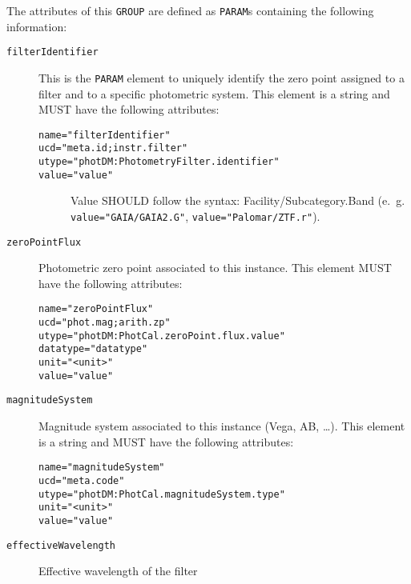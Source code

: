 \documentclass[11pt,a4paper]{ivoa} 
\let\fg=\color
\def\elem#1{{\tt{\fg{DarkRed}#1}}}
\def\attrval#1#2{{\tt{\fg{DarkRed}#1}="{\fg{DarkPurple}#2}"}}
\begin{document}
The attributes of this \elem{GROUP} are defined as \elem{PARAM}s
containing the following information:
\begin{description}
\item[\elem{filterIdentifier}] This is the \elem{PARAM} element to
  uniquely identify the zero point assigned to a filter and to a
  specific photometric system. This element is a string and MUST
  have the following attributes:
\begin{description}
    \item[\attrval{name}{filterIdentifier}]
    \item[\attrval{ucd}{meta.id;instr.filter}]
    \item[\attrval{utype}{photDM:PhotometryFilter.identifier}]
    \item[\attrval{value}{value}] Value SHOULD follow the syntax:
      Facility/Subcategory.Band (e.~g. \attrval{value}{GAIA/GAIA2.G},
      \attrval{value}{Palomar/ZTF.r}).
\end{description}
\item[\elem{zeroPointFlux}] Photometric zero point associated to this
  instance. This element MUST have the following attributes:
\begin{description}
    \item[\attrval{name}{zeroPointFlux}]
    \item[\attrval{ucd}{phot.mag;arith.zp}]
    \item[\attrval{utype}{photDM:PhotCal.zeroPoint.flux.value}]
    \item[\attrval{datatype}{datatype}]
    \item[\attrval{unit}{<unit>}]
    \item[\attrval{value}{value}]
\end{description}
\item[\elem{magnitudeSystem}] Magnitude system associated to this
  instance (Vega, AB, \dots). This element is a string and MUST have the
  following attributes:
\begin{description}
    \item[\attrval{name}{magnitudeSystem}]
    \item[\attrval{ucd}{meta.code}]
    \item[\attrval{utype}{photDM:PhotCal.magnitudeSystem.type}]
    \item[\attrval{unit}{<unit>}]
    \item[\attrval{value}{value}]
\end{description}
\item[\elem{effectiveWavelength}] Effective wavelength of the filter

\end{description}
\end{document}
